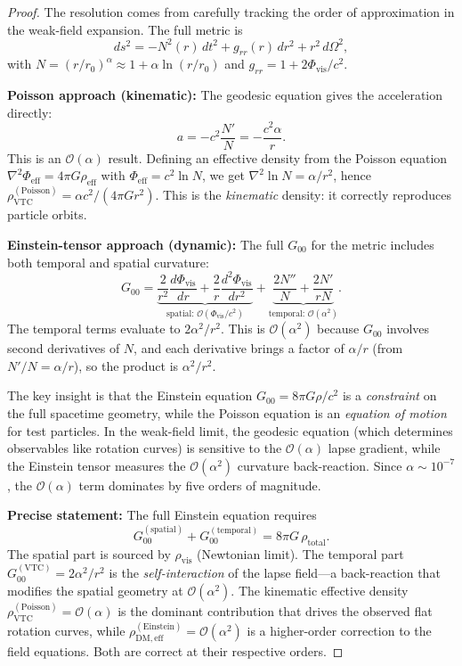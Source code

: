 \documentclass[11pt,a4paper]{article}
\theoremstyle{definition}
\newcommand{\vis}{\mathrm{vis}}
\newcommand{\eff}{\mathrm{eff}}
\newcommand{\DM}{\mathrm{DM}}
\newcommand{\VTC}{\mathrm{VTC}}
\begin{document}
\begin{proof}
The resolution comes from carefully tracking the order of approximation in the weak-field expansion. The full metric is
\begin{equation}
ds^2 = -N^2(r)\,dt^2 + g_{rr}(r)\,dr^2 + r^2\,d\Omega^2,
\end{equation}
with $N = (r/r_0)^\alpha \approx 1 + \alpha\ln(r/r_0)$ and $g_{rr} = 1 + 2\Phi_{\vis}/c^2$.

\textbf{Poisson approach (kinematic):} The geodesic equation gives the acceleration directly:
\begin{equation}
a = -c^2\frac{N'}{N} = -\frac{c^2\alpha}{r}.
\end{equation}
This is an $\mathcal{O}(\alpha)$ result. Defining an effective density from the Poisson equation $\nabla^2\Phi_{\eff} = 4\pi G\rho_{\eff}$ with $\Phi_{\eff} = c^2\ln N$, we get $\nabla^2\ln N = \alpha/r^2$, hence $\rho_{\VTC}^{\mathrm{(Poisson)}} = \alpha c^2/(4\pi G r^2)$. This is the \textit{kinematic} density: it correctly reproduces particle orbits.

\textbf{Einstein-tensor approach (dynamic):} The full $G_{00}$ for the metric includes both temporal and spatial curvature:
\begin{equation}
G_{00} = \underbrace{\frac{2}{r^2}\frac{d\Phi_{\vis}}{dr} + \frac{2}{r}\frac{d^2\Phi_{\vis}}{dr^2}}_{\text{spatial: } \mathcal{O}(\Phi_{\vis}/c^2)} + \underbrace{\frac{2N''}{N} + \frac{2N'}{rN}}_{\text{temporal: } \mathcal{O}(\alpha^2)}.
\end{equation}
The temporal terms evaluate to $2\alpha^2/r^2$. This is $\mathcal{O}(\alpha^2)$ because $G_{00}$ involves second derivatives of $N$, and each derivative brings a factor of $\alpha/r$ (from $N'/N = \alpha/r$), so the product is $\alpha^2/r^2$.

The key insight is that the Einstein equation $G_{00} = 8\pi G\rho/c^2$ is a \textit{constraint} on the full spacetime geometry, while the Poisson equation is an \textit{equation of motion} for test particles. In the weak-field limit, the geodesic equation (which determines observables like rotation curves) is sensitive to the $\mathcal{O}(\alpha)$ lapse gradient, while the Einstein tensor measures the $\mathcal{O}(\alpha^2)$ curvature back-reaction. Since $\alpha \sim 10^{-7}$, the $\mathcal{O}(\alpha)$ term dominates by five orders of magnitude.

\textbf{Precise statement:} The full Einstein equation requires
\begin{equation}
G_{00}^{(\mathrm{spatial})} + G_{00}^{(\mathrm{temporal})} = 8\pi G\,\rho_{\mathrm{total}}.
\end{equation}
The spatial part is sourced by $\rho_{\vis}$ (Newtonian limit). The temporal part $G_{00}^{(\VTC)} = 2\alpha^2/r^2$ is the \textit{self-interaction} of the lapse field---a back-reaction that modifies the spatial geometry at $\mathcal{O}(\alpha^2)$. The kinematic effective density $\rho_{\VTC}^{\mathrm{(Poisson)}} = \mathcal{O}(\alpha)$ is the dominant contribution that drives the observed flat rotation curves, while $\rho_{\DM,\eff}^{(\mathrm{Einstein})} = \mathcal{O}(\alpha^2)$ is a higher-order correction to the field equations. Both are correct at their respective orders.


\end{proof}
\end{document}
